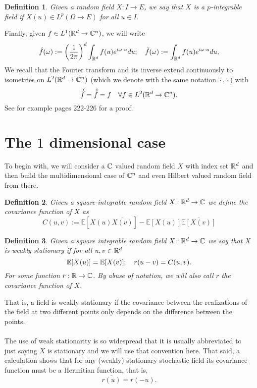 \documentclass[12pt]{article}
\newtheorem{definition}{Definition}
\begin{document}
\begin{definition}
    Given a  random field $X:I\to E$, we say that $X$ is a \emph{$p$-integrable field} if $X(u)\in L^p(\Omega\to E)$ for all $u\in I$.
\end{definition}
Finally, given $f\in L^1({\mathbb R}^d\to\mathbb{C}^n)$, we will write
\begin{equation}\label{ft def}
    \hat{f}(\omega):=\qty(\frac{1}{2\pi})^d\int_{{\mathbb R}^d} f(u)e^{i\omega\cdot  u}du;\quad\check{f}(\omega):=\int_{{\mathbb R}^d} f(u)e^{i\omega\cdot  u}du,
\end{equation}
We recall that the Fourier transform and its inverse extend continuously to isometries on $L^2({\mathbb R}^d\to\mathbb{C}^n)$ (which we denote with the same notation $\hat{\cdot},\check{\cdot}$) with
\begin{equation}
    \check{\hat{f}}=\hat{\check{f}}=f\quad\forall f\in L^2({\mathbb R}^d\to\mathbb{C}^n).
\end{equation}
See for example \cite{taylor2013partial} pages 222-226 for a proof.
\section{The $1$ dimensional case}\label{1d}
To begin with, we will consider a $\mathbb{C}$ valued random field $X$ with index set ${\mathbb R}^d$ and then build the multidimensional case of $\mathbb{C}^n$ and even Hilbert valued random field from there.
\begin{definition}
    Given a square-integrable random field $X:{\mathbb R}^d\to \mathbb{C}$ we define the \emph{covariance function} of $X$ as
    \begin{equation*}
        C(u,v):=\mathbb{E}[X(u)\overline{X(v)}]-\mathbb{E}[X(u)]\overline{\mathbb{E}[X(v)]}
    \end{equation*}
\end{definition}
\begin{definition}
    Given a square integrable random field $X:{\mathbb R}^d\to\mathbb{C}$  we say that $X$ is \emph{weakly stationary} if for all $u,v\in {\mathbb R}^d$
    \begin{equation*}
        \mathbb{E}[X(u)]=\mathbb{E}[X(v)];\quad r(u-v)=C(u,v).
    \end{equation*}
    For some function $r:{\mathbb R}\to \mathbb{C}$. By abuse of notation, we will also call $r$ the covariance function of $X$.
\end{definition}
That is, a field is weakly stationary if the covariance between the realizations of the field at two different points only depends on the difference between the points.\\
\\
The use of weak stationarity is so widespread that it is usually abbreviated to just saying $X$ is stationary and we will use that convention here. That said, a calculation shows that for any (weakly) stationary stochastic field its covariance function must be a Hermitian function, that is,
\begin{equation*}
    \overline{r(u)}=r(-u).
\end{equation*}
\end{document}
